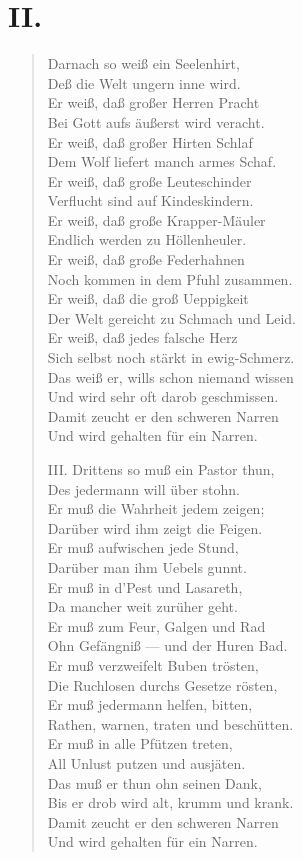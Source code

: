 \section{II.}

\begin{verse}
Darnach so weiß ein Seelenhirt,\\
Deß die Welt ungern inne wird.\\
Er weiß, daß großer Herren Pracht\\
Bei Gott aufs äußerst wird veracht.\\
Er weiß, daß großer Hirten Schlaf\\
Dem Wolf liefert manch armes Schaf.\\
Er weiß, daß große Leuteschinder\\
Verflucht sind auf Kindeskindern.\\
Er weiß, daß große Krapper-Mäuler\\
Endlich werden zu Höllenheuler.\\
Er weiß, daß große Federhahnen\\
Noch kommen in dem Pfuhl zusammen.\\
Er weiß, daß die groß Ueppigkeit\\
Der Welt gereicht zu Schmach und Leid.\\
Er weiß, daß jedes falsche Herz\\
Sich selbst noch stärkt in ewig-Schmerz.\\
Das weiß er, wills schon niemand wissen\\
Und wird sehr oft darob geschmissen.\\
Damit zeucht er den schweren Narren\\
Und wird gehalten für ein Narren.

III. Drittens so muß ein Pastor thun,\\
Des jedermann will über stohn.\\
Er muß die Wahrheit jedem zeigen;\\
Darüber wird ihm zeigt die Feigen.\\
Er muß aufwischen jede Stund,\\
Darüber man ihm Uebels gunnt.\\
Er muß in d’Pest und Lasareth,\\
Da mancher weit zurüher geht.\\
Er muß zum Feur, Galgen und Rad\\
Ohn Gefängniß — und der Huren Bad.\\
Er muß verzweifelt Buben trösten,\\
Die Ruchlosen durchs Gesetze rösten,\\
Er muß jedermann helfen, bitten,\\
Rathen, warnen, traten und beschütten.\\
Er muß in alle Pfützen treten,\\
All Unlust putzen und ausjäten.\\
Das muß er thun ohn seinen Dank,\\
Bis er drob wird alt, krumm und krank.\\
Damit zeucht er den schweren Narren\\
Und wird gehalten für ein Narren.


\end{verse}
